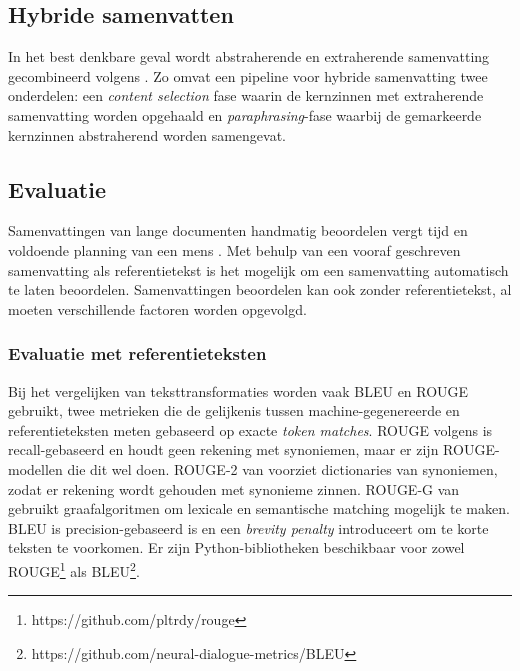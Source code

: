 \subsection{Hybride samenvatten}

In het best denkbare geval wordt abstraherende en extraherende samenvatting gecombineerd volgens \textcite{Hsu2018, Huang2019}. Zo omvat een pipeline voor hybride samenvatting twee onderdelen: een \textit{content selection} fase waarin de kernzinnen met extraherende samenvatting worden opgehaald en \textit{paraphrasing}-fase waarbij de gemarkeerde kernzinnen abstraherend worden samengevat. 

\subsection{Evaluatie}

Samenvattingen van lange documenten handmatig beoordelen vergt tijd en voldoende planning van een mens \autocite{Nenkova2004}. Met behulp van een vooraf geschreven samenvatting als referentietekst is het mogelijk om een samenvatting automatisch te laten beoordelen. Samenvattingen beoordelen kan ook zonder referentietekst, al moeten verschillende factoren worden opgevolgd.

\subsubsection{Evaluatie met referentieteksten}
Bij het vergelijken van teksttransformaties worden vaak BLEU en ROUGE gebruikt, twee metrieken die de gelijkenis tussen machine-gegenereerde en referentieteksten meten gebaseerd op exacte \textit{token matches}. ROUGE volgens \textcite{Lin2004} is recall-gebaseerd en houdt geen rekening met synoniemen, maar er zijn ROUGE-modellen die dit wel doen. ROUGE-2 van \textcite{Ganesan2018} voorziet dictionaries van synoniemen, zodat er rekening wordt gehouden met synonieme zinnen. ROUGE-G van \textcite{ShafieiBavani2018} gebruikt graafalgoritmen om lexicale en semantische matching mogelijk te maken. BLEU is precision-gebaseerd is en een \textit{brevity penalty} introduceert om te korte teksten te voorkomen. Er zijn Python-bibliotheken beschikbaar voor zowel ROUGE\footnote{https://github.com/pltrdy/rouge} als BLEU\footnote{https://github.com/neural-dialogue-metrics/BLEU}.

